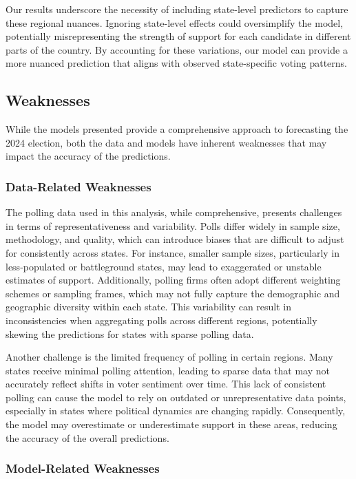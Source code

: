 \documentclass[
  letterpaper,
  DIV=11,
  numbers=noendperiod]{scrartcl}
\begin{document}
Our results underscore the necessity of including state-level predictors
to capture these regional nuances. Ignoring state-level effects could
oversimplify the model, potentially misrepresenting the strength of
support for each candidate in different parts of the country. By
accounting for these variations, our model can provide a more nuanced
prediction that aligns with observed state-specific voting patterns.

\subsection{Weaknesses}\label{weaknesses}

While the models presented provide a comprehensive approach to
forecasting the 2024 election, both the data and models have inherent
weaknesses that may impact the accuracy of the predictions.

\subsubsection{Data-Related Weaknesses}\label{data-related-weaknesses}

The polling data used in this analysis, while comprehensive, presents
challenges in terms of representativeness and variability. Polls differ
widely in sample size, methodology, and quality, which can introduce
biases that are difficult to adjust for consistently across states. For
instance, smaller sample sizes, particularly in less-populated or
battleground states, may lead to exaggerated or unstable estimates of
support. Additionally, polling firms often adopt different weighting
schemes or sampling frames, which may not fully capture the demographic
and geographic diversity within each state. This variability can result
in inconsistencies when aggregating polls across different regions,
potentially skewing the predictions for states with sparse polling data.

Another challenge is the limited frequency of polling in certain
regions. Many states receive minimal polling attention, leading to
sparse data that may not accurately reflect shifts in voter sentiment
over time. This lack of consistent polling can cause the model to rely
on outdated or unrepresentative data points, especially in states where
political dynamics are changing rapidly. Consequently, the model may
overestimate or underestimate support in these areas, reducing the
accuracy of the overall predictions.

\subsubsection{Model-Related Weaknesses}\label{model-related-weaknesses}
\end{document}
